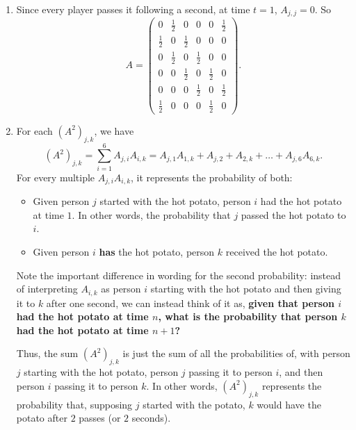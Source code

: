 \documentclass{homework}
\begin{document}
\begin{solution}
  \begin{enumerate}[label=(\alph*)]
    \item Since every player passes it following a second, at time $t=1$, $A_{j,j}=0$. So \[
        A = \begin{pmatrix} 0&\frac{1}{2}&0&0&0&\frac{1}{2} \\ \frac{1}{2}&0&\frac{1}{2}&0&0&0 \\
        0&\frac{1}{2}&0&\frac{1}{2}&0&0 \\ 0&0&\frac{1}{2}&0&\frac{1}{2}&0 \\
      0&0&0&\frac{1}{2}&0&\frac{1}{2} \\ \frac{1}{2}&0&0&0&\frac{1}{2}&0 \end{pmatrix} 
    .\] 

    \item For each $(A^2)_{j,k}$, we have \[
      (A^2)_{j,k}=\sum_{i=1}^{6} A_{j,i}A_{i,k}=A_{j,1}A_{1,k}+A_{j,2}+A_{2,k}+\ldots+A_{j,6}A_{6,k}
      .\] For every multiple $A_{j,i}A_{i,k}$, it represents the probability of both:
      \begin{itemize}
        \item Given person $j$ started with the hot potato, person $i$ had the hot potato at time $1$.
          In other words, the probability that $j$ passed the hot potato to $i$.
        \item Given person $i$ \textbf{has} the hot potato, person $k$ received the hot potato.  
      \end{itemize}
      Note the important difference in wording for the second probability: instead of interpreting
      $A_{i,k}$ as person $i$ starting with the hot potato and then giving it to $k$ after one second,
      we can instead think of it as, \textbf{given that person $i$ had the hot potato at time $n$, what is
      the probability that person $k$ had the hot potato at time $n+1$?} 
      
      Thus, the sum $(A^2)_{j,k}$ is just the sum of all the probabilities of, with person $j$
      starting with the hot potato, person $j$ passing it to person $i$, and then person $i$ passing
      it to person $k$. In other words, $(A^2)_{j,k}$ represents the probability that, supposing $j$ 
      started with the potato, $k$ would have the potato after $2$ passes (or $2$ seconds).


\end{enumerate}
\end{solution}
\end{document}
